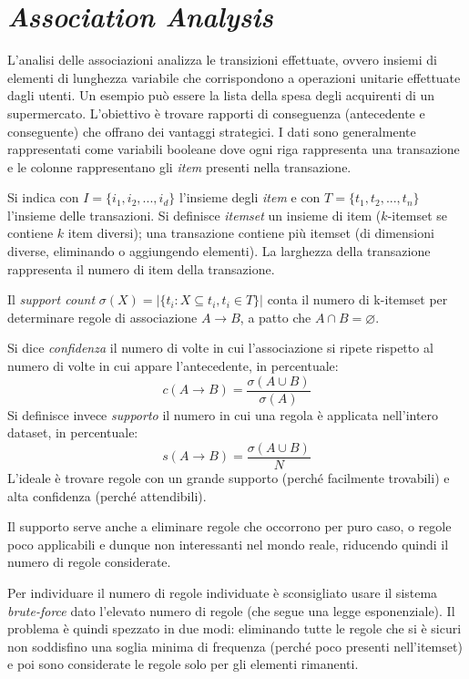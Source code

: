 \documentclass[11pt, a4page, twocolumn]{article}
\begin{document}
\newpage
\part{\textit{Association Analysis}}
L'analisi delle associazioni analizza le transizioni effettuate, ovvero insiemi di elementi di lunghezza variabile che corrispondono a operazioni unitarie effettuate dagli utenti.
Un esempio può essere la lista della spesa degli acquirenti di un supermercato.
L'obiettivo è trovare rapporti di conseguenza (antecedente e conseguente) che offrano dei vantaggi strategici.
I dati sono generalmente rappresentati come variabili booleane dove ogni riga rappresenta una transazione e le colonne rappresentano gli \textit{item} presenti nella transazione.

Si indica con $I = \{i_1, i_2, ..., i_d\}$ l'insieme degli \textit{item} e con $T = \{t_1, t_2, ..., t_n\}$ l'insieme delle transazioni.
Si definisce \textit{itemset} un insieme di item ($k$-itemset se contiene $k$ item diversi); una transazione contiene più itemset (di dimensioni diverse, eliminando o aggiungendo elementi).
La larghezza della transazione rappresenta il numero di item della transazione.

Il \textit{support count} $\sigma(X) = |\{t_i : X \subseteq t_i, t_i \in T\}|$ conta il numero di k-itemset per determinare regole di associazione $A \rightarrow B$, a patto che $A \cap B = \varnothing$.

Si dice \textit{confidenza} il numero di volte in cui l'associazione si ripete rispetto al numero di volte in cui appare l'antecedente, in percentuale:
\begin{equation*}
c(A \rightarrow B) = \frac{\sigma(A \cup B)}{\sigma(A)}
\end{equation*}
Si definisce invece \textit{supporto} il numero in cui una regola è applicata nell'intero dataset, in percentuale:
\begin{equation*}
s(A \rightarrow B) = \frac{\sigma(A \cup B)}{N}
\end{equation*}
L'ideale è trovare regole con un grande supporto (perché facilmente trovabili) e alta confidenza (perché attendibili).

Il supporto serve anche a eliminare regole che occorrono per puro caso, o regole poco applicabili e dunque non interessanti nel mondo reale, riducendo quindi il numero di regole considerate. \newline

Per individuare il numero di regole individuate è sconsigliato usare il sistema \textit{brute-force} dato l'elevato numero di regole (che segue una legge esponenziale).
Il problema è quindi spezzato in due modi: eliminando tutte le regole che si è sicuri non soddisfino una soglia minima di frequenza (perché poco presenti nell'itemset) e poi sono considerate le regole solo per gli elementi rimanenti.
\end{document}
